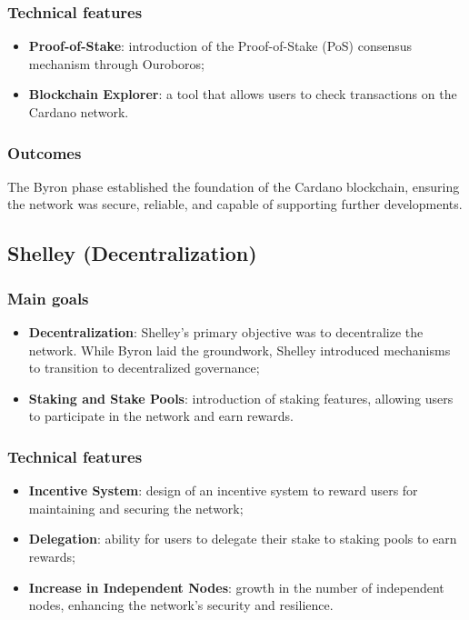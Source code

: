 \subsubsection*{Technical features}
\begin{itemize}
    \item \textbf{Proof-of-Stake}: introduction of the Proof-of-Stake (PoS) 
        consensus mechanism through Ouroboros;
    \item \textbf{Blockchain Explorer}: a tool that allows users to check 
        transactions on the Cardano network.
\end{itemize}

\subsubsection*{Outcomes}
The Byron phase established the foundation of the Cardano blockchain, ensuring 
the network was secure, reliable, and capable of supporting further developments.

\vspace{0.3cm}

\subsection{Shelley (Decentralization)}

\subsubsection*{Main goals}
\begin{itemize}
    \item \textbf{Decentralization}: Shelley’s primary objective was to decentralize 
        the network. While Byron laid the groundwork, Shelley introduced mechanisms to 
        transition to decentralized governance;
    \item \textbf{Staking and Stake Pools}: introduction of staking features, allowing 
        users to participate in the network and earn rewards.
\end{itemize}

\subsubsection*{Technical features}
\begin{itemize}
    \item \textbf{Incentive System}: design of an incentive system to reward 
        users for maintaining and securing the network;
    \item \textbf{Delegation}: ability for users to delegate their stake to staking 
        pools to earn rewards;
    \item \textbf{Increase in Independent Nodes}: growth in the number of independent 
        nodes, enhancing the network's security and resilience.
\end{itemize}

